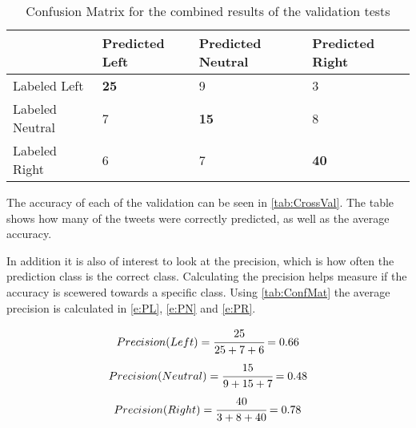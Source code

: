 \begin{table}[H]
\centering
\begin{tabular}{l|l|l|l|}
\cline{2-4}
& Predicted Left & Predicted Neutral & Predicted Right \\ \hline 
\multicolumn{1}{|l|}{Labeled Left} & \textbf{25} & 9 & 3 \\ \hline
\multicolumn{1}{|l|}{Labeled Neutral} & 7 & \textbf{15} & 8  \\ \hline
\multicolumn{1}{|l|}{Labeled Right} & 6 & 7 & \textbf{40} \\ \hline
\end{tabular}
\caption{Confusion Matrix for the combined results of the validation tests}
\label{tab:ConfMat}
\end{table}

The accuracy of each of the validation can be seen in \autoref{tab:CrossVal}.
The table shows how many of the tweets were correctly predicted, as well as
the average accuracy. 

\begin{table}[H]
\centering
{}
\caption{Accuracy for each of the cross validations}
\label{tab:CrossVal}
\end{table}

In addition it is also of interest to look at the precision, which is how often
the prediction class is the correct class. Calculating the precision helps
measure if the accuracy is scewered towards a specific class. Using
\autoref{tab:ConfMat} the average precision is calculated in \autoref{e:PL},
\autoref{e:PN} and \autoref{e:PR}.

\begin{equation}\label{e:PL}
Precision(Left) = \cfrac{25}{25+7+6} = 0.66
\end{equation}
\begin{equation}\label{e:PN}
Precision(Neutral) = \cfrac{15}{9+15+7} = 0.48
\end{equation}
\begin{equation}\label{e:PR}
Precision(Right) = \cfrac{40}{3+8+40} = 0.78
\end{equation}

